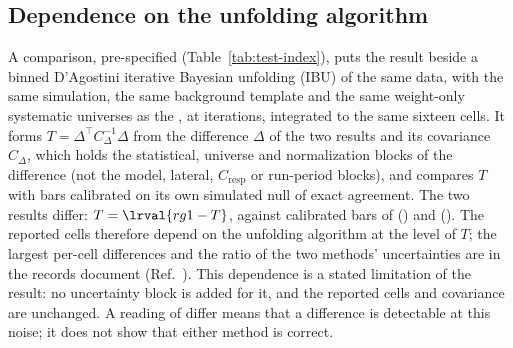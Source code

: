 \subsection{Dependence on the unfolding algorithm}
\label{sec:fived16-ibu}
A comparison, pre-specified (Table~\ref{tab:test-index}), puts the result beside a binned D'Agostini iterative Bayesian unfolding (IBU) of the same data, with the same simulation, the same background template and the same weight-only systematic universes as the \estMultiD{}, at  iterations, integrated to the same sixteen cells. It forms $T=\Delta^{\top}C_{\Delta}^{-1}\Delta$ from the difference $\Delta$ of the two results and its covariance $C_{\Delta}$, which holds the statistical, universe and normalization blocks of the difference (not the model, lateral, $C_{\mathrm{resp}}$ or run-period blocks), and compares $T$ with bars calibrated on its own simulated null of exact agreement. The two results differ: $T=\lrval{rg1-T}$, against calibrated bars of  () and  (). The reported cells therefore depend on the unfolding algorithm at the level of $T$; the largest per-cell differences and the ratio of the two methods' uncertainties are in the records document (Ref.~\cite{NoteRecords2026}). This dependence is a stated limitation of the result: no uncertainty block is added for it, and the reported cells and covariance are unchanged. A reading of differ means that a difference is detectable at this noise; it does not show that either method is correct.


